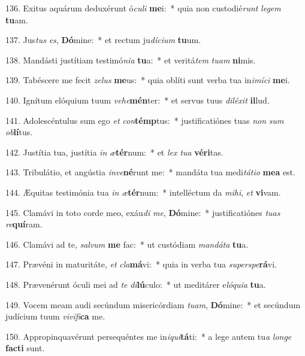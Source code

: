 136. Exitus aquárum deduxérunt ó\textit{cu}\textit{li} \textbf{me}i:~*  quia non custodié\textit{runt} \textit{le}\textit{gem} \textbf{tu}am.\

137. Jus\textit{tus} \textit{es}, \textbf{Dó}mine:~*  et rectum ju\textit{dí}\textit{ci}\textit{um} \textbf{tu}um.\

138. Mandásti justítiam testimó\textit{ni}\textit{a} \textbf{tu}a:~*  et veritá\textit{tem} \textit{tu}\textit{am} \textbf{ni}mis.\

139. Tabéscere me fecit \textit{ze}\textit{lus} \textbf{me}us:~*  quia oblíti sunt verba tua in\textit{i}\textit{mí}\textit{ci} \textbf{me}i.\

140. Ignítum elóquium tuum \textit{ve}\textit{he}\textbf{mén}ter:~*  et servus tuus \textit{di}\textit{lé}\textit{xit} \textbf{il}lud.\

141. Adolescéntulus sum ego \textit{et} \textit{con}\textbf{témp}tus:~*  justificatiónes tuas \textit{non} \textit{sum} \textit{ob}\textbf{lí}tus.\

142. Justítia tua, justítia \textit{in} \textit{æ}\textbf{tér}num:~*  et \textit{lex} \textit{tu}\textit{a} \textbf{vé}\textbf{ri}tas.\

143. Tribulátio, et angústia \textit{in}\textit{ve}\textbf{né}runt me:~*  mandáta tua medi\textit{tá}\textit{ti}\textit{o} \textbf{me}\textbf{a} est.\

144. Æquitas testimónia tua \textit{in} \textit{æ}\textbf{tér}num:~*  intelléctum da \textit{mi}\textit{hi}, \textit{et} \textbf{vi}vam.\

145. Clamávi in toto corde meo, exáu\textit{di} \textit{me}, \textbf{Dó}mine:~*  justificatiónes \textit{tu}\textit{as} \textit{re}\textbf{quí}ram.\

146. Clamávi ad te, \textit{sal}\textit{vum} \textbf{me} fac:~*  ut custódiam \textit{man}\textit{dá}\textit{ta} \textbf{tu}a.\

147. Prævéni in maturitáte, \textit{et} \textit{cla}\textbf{má}vi:~*  quia in verba tua \textit{su}\textit{per}\textit{spe}\textbf{rá}vi.\

148. Prævenérunt óculi mei ad \textit{te} \textit{di}\textbf{lú}culo:~*  ut meditárer e\textit{ló}\textit{qui}\textit{a} \textbf{tu}a.\

149. Vocem meam audi secúndum misericórdiam \textit{tu}\textit{am}, \textbf{Dó}mine:~*  et secúndum judícium tuum \textit{vi}\textit{ví}\textit{fi}\textbf{ca} me.\

150. Appropinquavérunt persequéntes me in\textit{i}\textit{qui}\textbf{tá}ti:~*  a lege autem tu\textit{a} \textit{lon}\textit{ge} \textbf{fac}\textbf{ti} sunt.\

